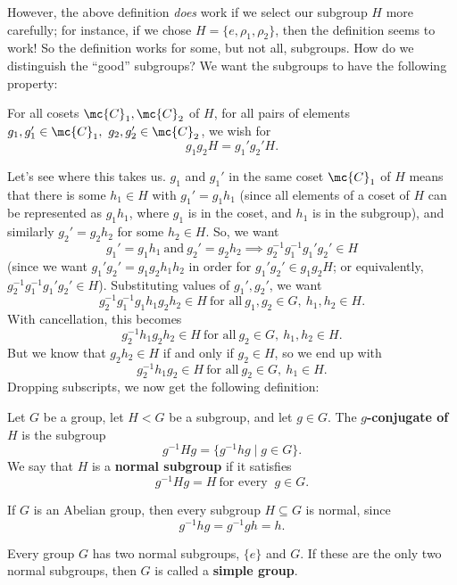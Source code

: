 \documentclass[math1530-lecture-notes]{subfiles}
\begin{document}
However, the above definition \textit{does} work if we select our subgroup $H$ more carefully; for
instance, if we chose $H=\{ e,\rho_1,\rho_2 \}$, then the definition seems to work! So the
definition works for some, but not all, subgroups. How do we distinguish the ``good'' subgroups? We
want the subgroups to have the following property: \begin{center}
  For all cosets $\mc{C}_1, \mc{C}_2$ of $H$, for all pairs of elements $g_1,g_1'\in \mc{C}_1,\
  g_2,g_2'\in \mc{C}_2$, we wish for \[
    g_1g_2H=g_1'g_2'H
  .\] 
\end{center}

Let's see where this takes us. $g_1$ and $g_1'$ in the same coset $\mc{C}_1$ of $H$ means that there
is some $h_1\in H$ with $g_1'=g_1h_1$ (since all elements of a coset of $H$ can be represented as
$g_1h_1$, where $g_1$ is in the coset, and $h_1$ is in the subgroup), and similarly $g_2'=g_2h_2$
for some $h_2\in H$. So, we want \[
  g_1'=g_1h_1~\text{and}~g_2'=g_2h_2 \implies g_2^{-1}g_1^{-1}g_1'g_2'\in H
\] (since we want $g_1'g_2'=g_1g_2h_1h_2$ in order for $g_1'g_2'\in g_1g_2H$; or equivalently,
$g_2^{-1}g_1^{-1}g_1'g_2'\in H$). Substituting values of $g_1', g_2'$, we want \[
  g_2^{-1}g_1^{-1}g_1h_1g_2h_2\in H ~\text{for all}~g_1,g_2\in G,\ h_1,h_2\in H
.\] With cancellation, this becomes \[
  g_2^{-1}h_1g_2h_2\in H~\text{for all}~g_2\in G,\ h_1,h_2\in H
.\] But we know that $g_2h_2\in H$ if and only if $g_2\in H$, so we end up with \[
  g_2^{-1}h_1g_2\in H~\text{for all}~g_2\in G,\ h_1\in H
.\] Dropping subscripts, we now get the following definition:
\begin{definition}{}
  Let $G$ be a group, let $H < G$ be a subgroup, and let $g\in G$. The \textbf{$g$-conjugate of $H$}
  is the subgroup \[
    g^{-1}Hg=\{g^{-1}hg\mid g\in G\} 
  .\] We say that $H$ is a \textbf{normal subgroup} if it satisfies \[
    g^{-1}Hg=H~\text{for every }~g\in G
  .\] 
\end{definition}

\begin{example}
  If $G$ is an Abelian group, then every subgroup $H\subseteq G$ is normal, since \[
    g^{-1}hg=g^{-1}gh=h
  .\] 
\end{example}

\begin{definition}{}
  Every group $G$ has two normal subgroups, $\{ e \}$ and $G$. If these are the only two normal
  subgroups, then $G$ is called a \textbf{simple group}.
\end{definition}
\end{document}
